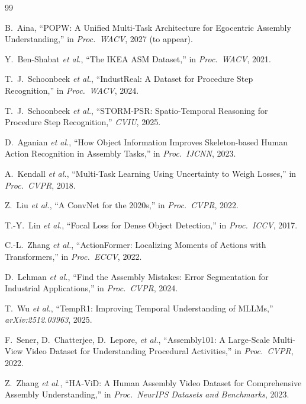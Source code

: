 \documentclass[10pt,journal,compsoc]{IEEEtran}
\begin{document}
\begin{thebibliography}{99}

B.~Aina,
``POPW: A Unified Multi-Task Architecture for Egocentric Assembly Understanding,''
in \emph{Proc.\ WACV}, 2027 (to appear).

Y.~Ben-Shabat \emph{et al.},
``The IKEA ASM Dataset,''
in \emph{Proc.\ WACV}, 2021.

T.~J.~Schoonbeek \emph{et al.},
``IndustReal: A Dataset for Procedure Step Recognition,''
in \emph{Proc.\ WACV}, 2024.

T.~J.~Schoonbeek \emph{et al.},
``STORM-PSR: Spatio-Temporal Reasoning for Procedure Step Recognition,''
\emph{CVIU}, 2025.

D.~Aganian \emph{et al.},
``How Object Information Improves Skeleton-based Human Action Recognition in Assembly Tasks,''
in \emph{Proc.\ IJCNN}, 2023.

A.~Kendall \emph{et al.},
``Multi-Task Learning Using Uncertainty to Weigh Losses,''
in \emph{Proc.\ CVPR}, 2018.

Z.~Liu \emph{et al.},
``A ConvNet for the 2020s,''
in \emph{Proc.\ CVPR}, 2022.

T.-Y.~Lin \emph{et al.},
``Focal Loss for Dense Object Detection,''
in \emph{Proc.\ ICCV}, 2017.

C.-L.~Zhang \emph{et al.},
``ActionFormer: Localizing Moments of Actions with Transformers,''
in \emph{Proc.\ ECCV}, 2022.

D.~Lehman \emph{et al.},
``Find the Assembly Mistakes: Error Segmentation for Industrial Applications,''
in \emph{Proc.\ CVPR}, 2024.

T.~Wu \emph{et al.},
``TempR1: Improving Temporal Understanding of MLLMs,''
\emph{arXiv:2512.03963}, 2025.

F.~Sener, D.~Chatterjee, D.~Lepore, \emph{et al.},
``Assembly101: A Large-Scale Multi-View Video Dataset for Understanding Procedural Activities,''
in \emph{Proc.\ CVPR}, 2022.

Z.~Zhang \emph{et al.},
``HA-ViD: A Human Assembly Video Dataset for Comprehensive Assembly Understanding,''
in \emph{Proc.\ NeurIPS Datasets and Benchmarks}, 2023.


\end{thebibliography}
\end{document}
